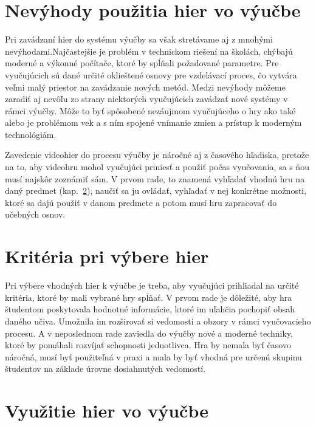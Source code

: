 \documentclass[10pt,twoside,slovak,a4paper]{article}
\begin{document}
\section{Nevýhody použitia hier vo výučbe} \label{nevyhody}

Pri zavádzaní hier do systému výučby sa však stretávame aj z mnohými nevýhodami.Najčastejšie je problém v technickom riešení na školách, chýbajú moderné a výkonné počítače, ktoré by spĺňali požadované parametre\cite{Videohry}. Pre vyučujúcich sú dané určité oklieštené osnovy pre vzdelávací proces, čo vytvára veľmi malý priestor na zavádzanie nových metód. Medzi nevýhody môžeme zaradiť aj nevôľu zo strany niektorých vyučujúcich zavádzať nové systémy v rámci výučby. Môže to byť spôsobené nezáujmom vyučujúceho o hry ako také alebo je problémom vek a s ním spojené vnímanie zmien a prístup k moderným technológiám.

Zavedenie videohier do procesu výučby je náročné aj z časového hľadiska, pretože na to, aby videohru mohol vyučujúci priniesť a použiť počas vyučovania, sa s ňou musí najskôr zoznámiť sám. V prvom rade, to znamená vyhľadať vhodnú hru na daný predmet (kap.~\ref{kriteria}), naučiť sa ju ovládať, vyhľadať v nej konkrétne možnosti, ktoré sa dajú použiť v danom predmete a potom musí hru zapracovať do učebných osnov.

\section{Kritéria pri výbere hier} \label{kriteria}

Pri výbere vhodných hier k výučbe je treba, aby vyučujúci prihliadal na určité kritéria, ktoré by mali vybrané hry spĺňať. V prvom rade je dôležité, aby hra študentom poskytovala hodnotné informácie, ktoré im uľahčia pochopiť obsah daného učiva. Umožnila im rozširovať si vedomosti a obzory v rámci vyučovacieho procesu. A v neposlednom rade zaviedla do výučby nové a moderné techniky, ktoré by pomáhali rozvíjať schopnosti jednotlivca. Hra by nemala byť časovo náročná, musí byť použiteľná v praxi a mala by byť vhodná pre určenú skupinu študentov na základe úrovne dosiahnutých vedomostí.

\section{Využitie hier vo výučbe} \label{vyuzitie}
\end{document}
